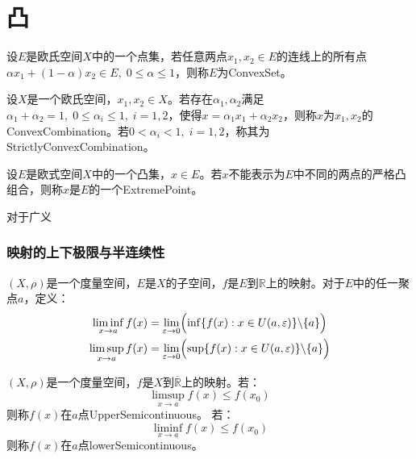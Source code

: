 \chapter{凸}

\begin{definition}
	设$E$是欧氏空间$X$中的一个点集，若任意两点$x_1,x_2\in E$的连线上的所有点$\alpha x_1+(1-\alpha)x_2\in E,\;0\leqslant\alpha\leqslant1$，则称$E$为\gls{ConvexSet}。
\end{definition}
\begin{definition}
	设$X$是一个欧氏空间，$x_1,x_2\in X$。若存在$\alpha_1,\alpha_2$满足$\alpha_1+\alpha_2=1,\;0\leqslant\alpha_i\leqslant1,\;i=1,2$，使得$x=\alpha_1x_1+\alpha_2x_2$，则称$x$为$x_1,x_2$的\gls{ConvexCombination}。若$0<\alpha_i<1,\;i=1,2$，称其为\gls{StrictlyConvexCombination}。
\end{definition}
\begin{definition}
	设$E$是欧式空间$X$中的一个凸集，$x\in E$。若$x$不能表示为$E$中不同的两点的严格凸组合，则称$x$是$E$的一个\gls{ExtremePoint}。
\end{definition}

\begin{definition}
	对于广义
\end{definition}

\subsection{映射的上下极限与半连续性}
\begin{definition}
	$(X,\rho)$是一个度量空间，$E$是$X$的子空间，$f$是$E$到$\mathbb{R}$上的映射。对于$E$中的任一聚点$a$，定义：
	\begin{gather*}
		\liminf_{x\to a}f(x)=\lim_{\varepsilon\to0}\Bigl(\inf\{f(x):x\in U(a,\varepsilon)\}\backslash\{a\}\Bigr) \\
		\limsup_{x\to a}f(x)=\lim_{\varepsilon\to0}\Bigl(\sup\{f(x):x\in U(a,\varepsilon)\}\backslash\{a\}\Bigr)
	\end{gather*}
\end{definition}
\begin{definition}
	$(X,\rho)$是一个度量空间，$f$是$X$到$\overline{\mathbb{R}}$上的映射。若：
	\begin{equation*}
		\limsup_{x\to a}f(x)\leqslant f(x_0)
	\end{equation*}
	则称$f(x)$在$a$点\gls{UpperSemicontinuous}。
	若：
	\begin{equation*}
		\liminf_{x\to a}f(x)\leqslant f(x_0)
	\end{equation*}
	则称$f(x)$在$a$点\gls{lowerSemicontinuous}。
\end{definition}
